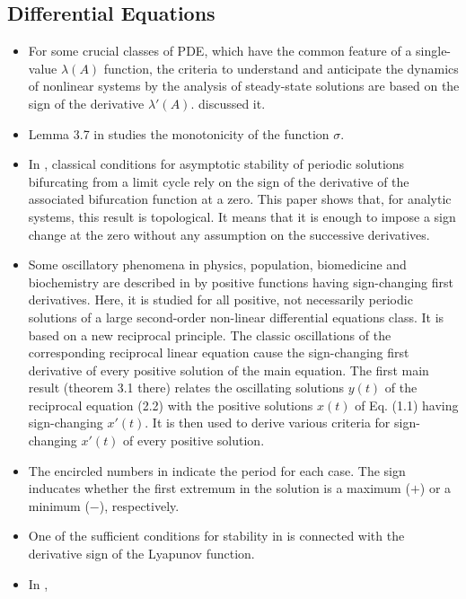 \documentclass[11pt]{book}
\begin{document}
\subsection{Differential Equations}
\begin{itemize}
\item For some crucial classes of PDE, which have the common feature of
a single-value $\lambda\left(A\right)$ function, the criteria to
understand and anticipate the dynamics of nonlinear systems by the
analysis of steady-state solutions are based on the sign of the derivative
$\lambda'\left(A\right)$. \cite{politi2007modified}
discussed it.
\item Lemma 3.7 in \cite{bernetti2008exact}
studies the monotonicity of the function $\sigma$.
\item In \cite{makarenkov2011asymptotic},
classical conditions for asymptotic stability of periodic solutions
bifurcating from a limit cycle rely on the sign of the derivative
of the associated bifurcation function at a zero. This paper shows
that, for analytic systems, this result is topological. It means that
it is enough to impose a sign change at the zero without any assumption
on the successive derivatives.
\item Some oscillatory phenomena in physics, population, biomedicine and
biochemistry are described in \cite{pavsic2015sign}
by positive functions having sign-changing first derivatives. Here,
it is studied for all positive, not necessarily periodic solutions
of a large second-order non-linear differential equations class. It
is based on a new reciprocal principle. The classic oscillations of
the corresponding reciprocal linear equation cause the sign-changing
first derivative of every positive solution of the main equation.
The first main result (theorem 3.1 there) relates the oscillating
solutions $y\left(t\right)$ of the reciprocal equation (2.2) with
the positive solutions $x\left(t\right)$ of Eq. (1.1) having sign-changing
$x'\left(t\right)$. It is then used to derive various criteria for
sign-changing $x'\left(t\right)$ of every positive solution.
\item The encircled numbers in \cite{zegeling2018nonstandard}
indicate the period for each case. The sign inducates whether the
first extremum in the solution is a maximum ($+$) or a minimum ($-$),
respectively.
\item One of the sufficient conditions for stability in \cite{agarwal2018applications}
is connected with the derivative sign of the Lyapunov function.
\item In \cite{fiedler2020coexistence},

\end{itemize}
\end{document}
